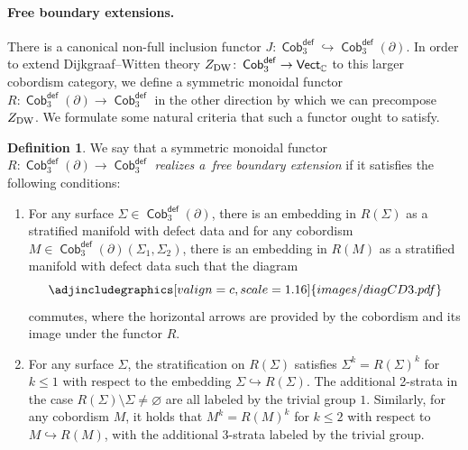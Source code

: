 \documentclass[10pt,a4paper]{amsart}
\DeclareMathOperator{\vect}{\mathsf{Vect}}
\DeclareMathOperator{\C}{\mathbb{C}}
\DeclareMathOperator{\Cob}{\mathsf{Cob}}
\numberwithin{equation}{section}
\theoremstyle{definition}
\newtheorem{Definition}[Definition]{Definition}
\begin{document}
\paragraph{Free boundary extensions.} There is a canonical non-full inclusion functor $J\colon \Cob_3^{\mathsf{def}} \hookrightarrow \Cob_3^{\mathsf{def}}(\partial)$. In order to extend Dijkgraaf--Witten theory $Z_{\rm DW}\colon \Cob_3^{\mathsf{def}} \rightarrow \vect_{\C}$ to this larger cobordism category, we define a symmetric monoidal functor
$R\colon \Cob_3^{\mathsf{def}}(\partial) \rightarrow \Cob_3^{\mathsf{def}}$
in the other direction by which we can precompose $Z_{\rm DW}$. We formulate some natural criteria that such a functor ought to satisfy.
\begin{Definition}\label{defFBE}
 We say that a symmetric monoidal functor $R\colon \Cob_3^{\mathsf{def}}(\partial) \rightarrow \Cob_3^{\mathsf{def}}$ \textit{realizes a~free boundary extension} if it satisfies the following conditions:
 \begin{enumerate}[(F1)]\itemsep=0pt
 \item \label{F1} For any surface $\Sigma \in \Cob_3^{\mathsf{def}}(\partial)$, there is an embedding in $R(\Sigma)$ as a stratified manifold with defect data and for any cobordism $M \in \Cob_3^{\mathsf{def}}(\partial)(\Sigma_1, \Sigma_2)$, there is an embedding in $R(M)$ as a stratified manifold with defect data such that the diagram
 \[
 \centering
 \adjincludegraphics[valign=c, scale = 1.16]{images/diagCD3.pdf}
 \]
 commutes, where the horizontal arrows are provided by the cobordism and its image under the functor $R$.
 \item \label{F2} For any surface $\Sigma$, the stratification on $R(\Sigma)$ satisfies $\Sigma^k = R(\Sigma)^k$ for $k \leq 1$
 with respect to the embedding $\Sigma \hookrightarrow R(\Sigma)$. The additional 2-strata in the case $R(\Sigma)\setminus\Sigma \neq \varnothing$ are all labeled by the trivial group $1$. Similarly, for any cobordism $M$, it holds that $M^k = R(M)^k$ for $k \leq 2$ with respect to $M \hookrightarrow R(M)$, with the additional 3-strata labeled by the trivial group.
 \end{enumerate}
\end{Definition}
\end{document}

